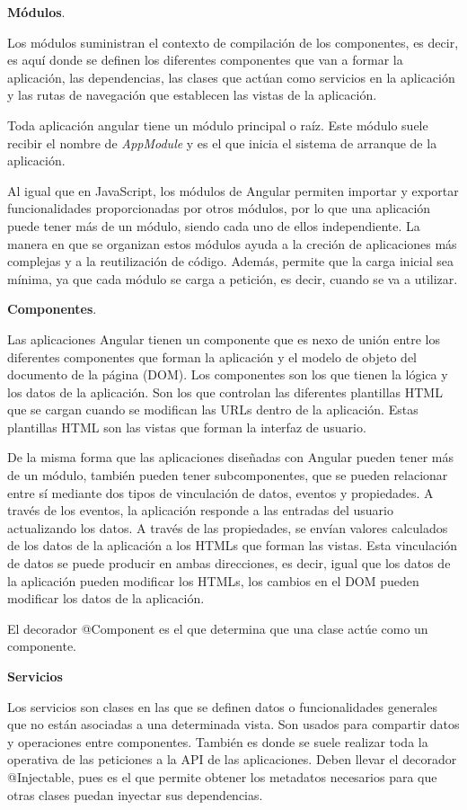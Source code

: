 \documentclass[a4paper, 12pt]{book}
\begin{document}
\textbf{Módulos}.

Los módulos suministran el contexto de compilación de los componentes, es decir, es aquí donde se definen los diferentes componentes que van a formar la aplicación, las dependencias, las clases que actúan como servicios en la aplicación y las rutas de navegación que establecen las vistas de la aplicación. 

Toda aplicación angular tiene un módulo principal o raíz. Este módulo suele recibir el nombre de \emph{AppModule} y es el que inicia el sistema de arranque de la aplicación.

Al igual que en JavaScript, los módulos de Angular permiten importar y exportar funcionalidades proporcionadas por otros módulos, por lo que una aplicación puede tener más de un módulo, siendo cada uno de ellos independiente. La manera en que se organizan estos módulos ayuda a la creción de aplicaciones más complejas y a la reutilización de código. Además, permite que la carga inicial sea mínima, ya que cada módulo se carga a petición, es decir, cuando se va a utilizar. 

\textbf{Componentes}. 

Las aplicaciones Angular tienen un componente que es nexo de unión entre los diferentes componentes que forman la aplicación y el modelo de objeto del documento de la página (DOM). Los componentes son los que tienen la lógica y los datos de la aplicación. Son los que controlan las diferentes plantillas HTML que se cargan cuando se modifican las URLs dentro de la aplicación. Estas plantillas HTML son las vistas que forman la interfaz de usuario.

De la misma forma que las aplicaciones diseñadas con Angular pueden tener más de un módulo, también pueden tener subcomponentes, que se pueden relacionar entre sí mediante dos tipos de vinculación de datos, eventos y propiedades. A través de los eventos, la aplicación responde a las entradas del usuario actualizando los datos. A través de las propiedades, se envían valores calculados de los datos de la aplicación a los HTMLs que forman las vistas. Esta vinculación de datos se puede producir en ambas direcciones, es decir, igual que los datos de la aplicación pueden modificar los HTMLs, los cambios en el DOM pueden modificar los datos de la aplicación.

El decorador @Component es el que determina que una clase actúe como un componente. 

\textbf{Servicios}

Los servicios son clases en las que se definen datos o funcionalidades generales que no están asociadas a una determinada vista. Son usados para compartir datos y operaciones entre componentes. También es donde se suele realizar toda la operativa de las peticiones a la API de las aplicaciones. Deben llevar el decorador @Injectable, pues es el que permite obtener los metadatos necesarios para que otras clases puedan inyectar sus dependencias. 
\end{document}

